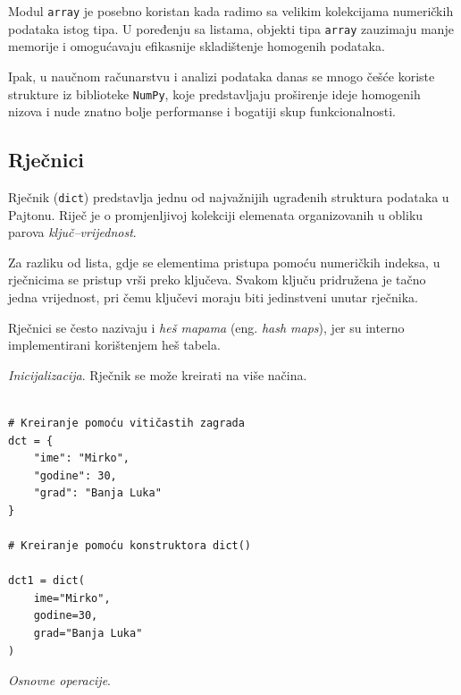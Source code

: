 
Modul \texttt{array} je posebno koristan kada radimo sa velikim kolekcijama numeričkih podataka istog tipa. U poređenju sa listama, objekti tipa \texttt{array} zauzimaju manje memorije i omogućavaju efikasnije skladištenje homogenih podataka.

Ipak, u naučnom računarstvu i analizi podataka danas se mnogo češće koriste strukture iz biblioteke \texttt{NumPy}, koje predstavljaju proširenje ideje homogenih nizova i nude znatno bolje performanse i bogatiji skup funkcionalnosti.




\subsection{Rječnici}

Rječnik (\texttt{dict}) predstavlja jednu od najvažnijih ugrađenih struktura podataka u Pajtonu. Riječ je o promjenljivoj kolekciji elemenata organizovanih u obliku parova \emph{ključ--vrijednost}.

Za razliku od lista, gdje se elementima pristupa pomoću numeričkih indeksa, u rječnicima se pristup vrši preko ključeva. Svakom ključu pridružena je tačno jedna vrijednost, pri čemu ključevi moraju biti jedinstveni unutar rječnika.

Rječnici se često nazivaju i \textit{heš mapama} (eng. \textit{hash maps}), jer su interno implementirani korištenjem heš tabela.

\textit{Inicijalizacija}.  Rječnik se može kreirati na više načina.

\begin{verbatim}
	
# Kreiranje pomoću vitičastih zagrada
dct = {
    "ime": "Mirko",
    "godine": 30,
    "grad": "Banja Luka"
}

# Kreiranje pomoću konstruktora dict()

dct1 = dict(
    ime="Mirko",
    godine=30,
    grad="Banja Luka"
)
\end{verbatim}

\textit{Osnovne operacije}. 

